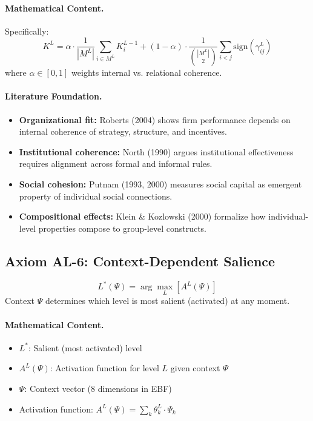 \paragraph{Mathematical Content.}
Specifically:
\begin{equation}
K^L = \alpha \cdot \frac{1}{|M^L|} \sum_{i \in M^L} K^{L-1}_i + (1-\alpha) \cdot \frac{1}{\binom{|M^L|}{2}} \sum_{i < j} \text{sign}(\gamma^L_{ij})
\end{equation}
where $\alpha \in [0,1]$ weights internal vs. relational coherence.

\paragraph{Literature Foundation.}
\begin{itemize}
\item \textbf{Organizational fit:} Roberts (2004) shows firm performance depends 
on internal coherence of strategy, structure, and incentives.
\item \textbf{Institutional coherence:} North (1990) argues institutional 
effectiveness requires alignment across formal and informal rules.
\item \textbf{Social cohesion:} Putnam (1993, 2000) measures social capital 
as emergent property of individual social connections.
\item \textbf{Compositional effects:} Klein \& Kozlowski (2000) formalize how 
individual-level properties compose to group-level constructs.
\end{itemize}

\subsection{Axiom AL-6: Context-Dependent Salience}

\begin{tcolorbox}[colback=gray!5!white, colframe=gray!75!black, title=Axiom AL-6: Context Salience]
\begin{equation}
\boxed{
L^*(\Psi) = \arg\max_L \left[ A^L(\Psi) \right]
}
\end{equation}
Context $\Psi$ determines which level is most salient (activated) at any moment.
\end{tcolorbox}

\paragraph{Mathematical Content.}
\begin{itemize}
\item $L^*$: Salient (most activated) level
\item $A^L(\Psi)$: Activation function for level $L$ given context $\Psi$
\item $\Psi$: Context vector (8 dimensions in EBF)
\item Activation function: $A^L(\Psi) = \sum_k \theta^L_k \cdot \Psi_k$
\end{itemize}

